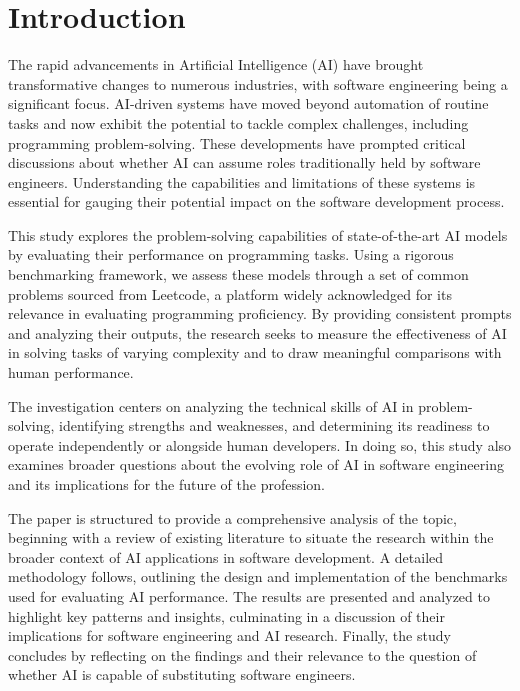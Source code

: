 \section{Introduction}

The rapid advancements in Artificial Intelligence (AI) have brought transformative changes to numerous industries, with software engineering being a significant focus. AI-driven systems have moved beyond automation of routine tasks and now exhibit the potential to tackle complex challenges, including programming problem-solving. These developments have prompted critical discussions about whether AI can assume roles traditionally held by software engineers. Understanding the capabilities and limitations of these systems is essential for gauging their potential impact on the software development process.

This study explores the problem-solving capabilities of state-of-the-art AI models by evaluating their performance on programming tasks. Using a rigorous benchmarking framework, we assess these models through a set of common problems sourced from Leetcode, a platform widely acknowledged for its relevance in evaluating programming proficiency. By providing consistent prompts and analyzing their outputs, the research seeks to measure the effectiveness of AI in solving tasks of varying complexity and to draw meaningful comparisons with human performance.

The investigation centers on analyzing the technical skills of AI in problem-solving, identifying strengths and weaknesses, and determining its readiness to operate independently or alongside human developers. In doing so, this study also examines broader questions about the evolving role of AI in software engineering and its implications for the future of the profession.

The paper is structured to provide a comprehensive analysis of the topic, beginning with a review of existing literature to situate the research within the broader context of AI applications in software development. A detailed methodology follows, outlining the design and implementation of the benchmarks used for evaluating AI performance. The results are presented and analyzed to highlight key patterns and insights, culminating in a discussion of their implications for software engineering and AI research. Finally, the study concludes by reflecting on the findings and their relevance to the question of whether AI is capable of substituting software engineers.

